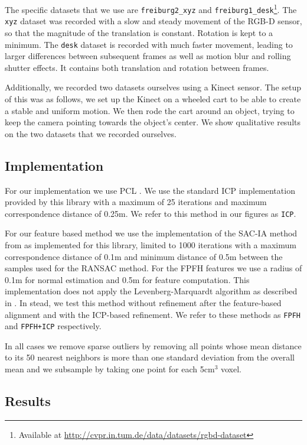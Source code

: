 \documentclass[a4paper]{article}
\begin{document}
The specific datasets that we use are \texttt{freiburg2\_xyz} and \texttt{freiburg1\_desk}\footnote{Available at \url{http://cvpr.in.tum.de/data/datasets/rgbd-dataset}}. The \texttt{xyz} dataset was recorded with a slow and steady movement of the RGB-D sensor, so that the magnitude of the translation is constant. Rotation is kept to a minimum. The \texttt{desk} dataset is recorded with much faster movement, leading to larger differences between subsequent frames as well as motion blur and rolling shutter effects. It contains both translation and rotation between frames.

Additionally, we recorded two datasets ourselves using a Kinect sensor. The setup of this was as follows, we set up the Kinect on a wheeled cart to be able to create a stable and uniform motion. We then rode the cart around an object, trying to keep the camera pointing towards the object's center. We show qualitative results on the two datasets that we recorded ourselves.

\subsection{Implementation}

For our implementation we use \ac{PCL} \cite{Rusu_ICRA2011_PCL}. We use the standard \ac{ICP} implementation provided by this library with a maximum of 25 iterations and maximum correspondence distance of 0.25m. We refer to this method in our figures as \texttt{ICP}.

 For our feature based method we use the implementation of the \ac{SAC-IA} method from \cite{rusu2009fast} as implemented for this library, limited to 1000 iterations with a maximum correspondence distance of 0.1m and minimum distance of 0.5m between the samples used for the \ac{RANSAC} method. For the \ac{FPFH} features we use a radius of 0.1m for normal estimation and 0.5m for feature computation. This implementation does not apply the Levenberg-Marquardt algorithm as described in \cite{rusu2009fast}. In stead, we test this method without refinement after the feature-based alignment and with the ICP-based refinement. We refer to these methods as \texttt{FPFH} and \texttt{FPFH+ICP} respectively.
 
 In all cases we remove sparse outliers by removing all points whose mean distance to its 50 nearest neighbors is more than one standard deviation from the overall mean and we subsample by taking one point for each 5cm$^3$ voxel.


\subsection{Results}
\end{document}
